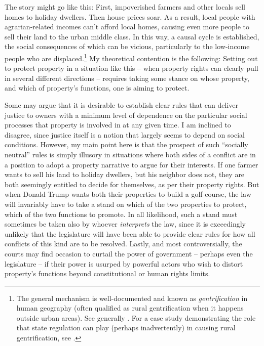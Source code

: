The story might go like this: First, impoverished farmers and other locals sell homes to holiday dwellers. Then house prices soar. As a result, local people with agrarian-related incomes can't afford local homes, causing even more people to sell their land to the urban middle class. In this way, a causal cycle is established, the social consequences of which can be vicious, particularly to the low-income people who are displaced.\footnote{The general mechanism is well-documented and known as {\it gentrification} in human geography (often qualified as rural gentrification when it happens outside urban areas). See generally \cite{weesep94,phillips93,slater06}. For a case study demonstrating the role that state regulation can play (perhaps inadvertently) in causing rural gentrification, see \cite[1027-1030]{darling05}.} My theoretical contention is the following: Setting out to protect property in a situation like this -- when property rights can clearly pull in several different directions -- requires taking some stance on whose property, and which of property's functions, one is aiming to protect.

Some may argue that it is desirable to establish clear rules that can deliver justice to owners with a minimum level of dependence on the particular social processes that property is involved in at any given time. I am inclined to disagree, since justice itself is a notion that largely seems to depend on social conditions. However, my main point here is that the prospect of such ``socially neutral'' rules is simply illusory in situations where both sides of a conflict are in a position to adopt a property narrative to argue for their interests.  If one farmer wants to sell his land to holiday dwellers, but his neighbor does not, they are both seemingly entitled to decide for themselves, as per their property rights. But when Donald Trump wants both their properties to build a golf-course, the law will invariably have to take a stand on which of the two properties to protect, which of the two functions to promote. In all likelihood, such a stand must sometimes be taken also by whoever {\it interprets} the law, since it is exceedingly unlikely that the legislature will have been able to provide clear rules for how all conflicts of this kind are to be resolved. Lastly, and most controversially, the courts may find occasion to curtail the power of government -- perhaps even the legislature -- if their power is usurped by powerful actors who wish to distort property's functions beyond constitutional or human rights limits.

